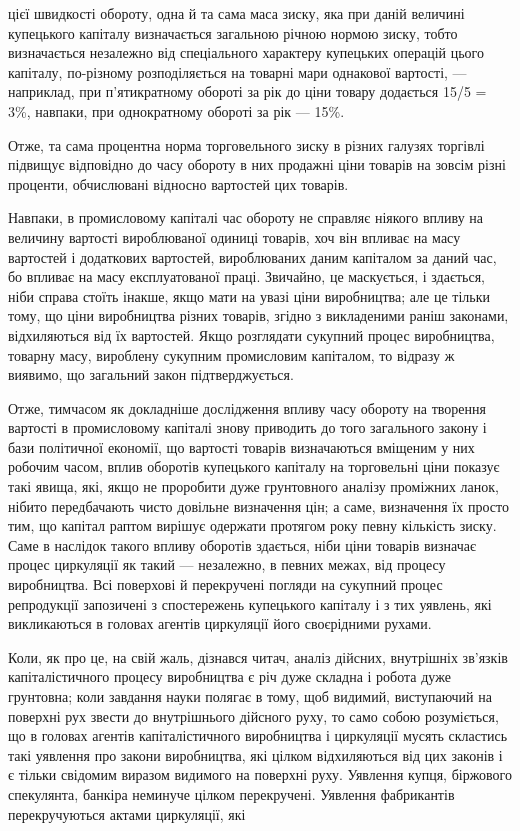 \parcont{}  %
цієї швидкості обороту, одна й та сама маса зиску, яка при даній
величині купецького капіталу визначається загальною річною
нормою зиску, тобто визначається незалежно від спеціального
характеру купецьких операцій цього капіталу, по-різному розподіляється
на товарні мари однакової вартості, — наприклад, при п’ятикратному
обороті за рік до ціни товару додається 15/5 = 3\%,
навпаки, при однократному обороті за рік — 15\%.

Отже, та сама процентна норма торговельного зиску в різних
галузях торгівлі підвищує відповідно до часу обороту в них
продажні ціни товарів на зовсім різні проценти, обчислювані
відносно вартостей цих товарів.

Навпаки, в промисловому капіталі час обороту не справляє
ніякого впливу на величину вартості вироблюваної одиниці товарів,
хоч він впливає на масу вартостей і додаткових вартостей,
вироблюваних даним капіталом за даний час, бо впливає на
масу експлуатованої праці. Звичайно, це маскується, і здається,
ніби справа стоїть інакше, якщо мати на увазі ціни виробництва;
але це тільки тому, що ціни виробництва різних товарів, згідно
з викладеними раніш законами, відхиляються від їх вартостей.
Якщо розглядати сукупний процес виробництва, товарну масу,
вироблену сукупним промисловим капіталом, то відразу ж виявимо,
що загальний закон підтверджується.

Отже, тимчасом як докладніше дослідження впливу часу
обороту на творення вартості в промисловому капіталі знову
приводить до того загального закону і бази політичної економії,
що вартості товарів визначаються вміщеним у них робочим
часом, вплив оборотів купецького капіталу на торговельні ціни
показує такі явища, які, якщо не проробити дуже грунтовного аналізу
проміжних ланок, нібито передбачають чисто довільне визначення
цін; а саме, визначення їх просто тим, що капітал раптом
вирішує одержати протягом року певну кількість зиску. Саме
в наслідок такого впливу оборотів здається, ніби ціни товарів
визначає процес циркуляції як такий — незалежно, в певних межах,
від процесу виробництва. Всі поверхові й перекручені
погляди на сукупний процес репродукції запозичені з спостережень
купецького капіталу і з тих уявлень, які викликаються
в головах агентів циркуляції його своєрідними рухами.

Коли, як про це, на свій жаль, дізнався читач, аналіз дійсних,
внутрішніх зв’язків капіталістичного процесу виробництва є
річ дуже складна і робота дуже грунтовна; коли завдання
науки полягає в тому, щоб видимий, виступаючий на поверхні
рух звести до внутрішнього дійсного руху, то само собою
розуміється, що в головах агентів капіталістичного виробництва
і циркуляції мусять скластись такі уявлення про закони виробництва,
які цілком відхиляються від цих законів і є тільки свідомим
виразом видимого на поверхні руху. Уявлення купця,
біржового спекулянта, банкіра неминуче цілком перекручені.
Уявлення фабрикантів перекручуються актами циркуляції, які
\parbreak{}  %
